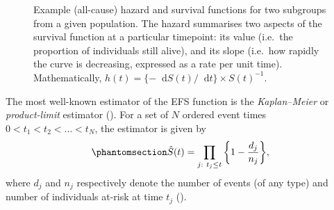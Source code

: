 \documentclass[
  letterpaper,
  DIV=11,
  numbers=noendperiod]{scrreprt}
\newcommand\diff{\mathop{}\!\mathrm{d}}
\begin{document}
\begin{figure}


\caption{\label{fig-intro-haz}Example (all-cause) hazard and survival
functions for two subgroups from a given population. The hazard
summarises two aspects of the survival function at a particular
timepoint: its value (i.e.~the proportion of individuals still alive),
and its slope (i.e.~how rapidly the curve is decreasing, expressed as a
rate per unit time). Mathematically,
\(h(t) = \{-\diff S(t)/\diff t\} \times S(t)^{-1}\).}

\end{figure}%

The most well-known estimator of the EFS function is the
\emph{Kaplan--Meier} or \emph{product-limit} estimator
(). For a set of \(N\) ordered event times
\(0 < t_1 < t_2 < \dots < t_N\), the estimator is given by
\begin{equation}\phantomsection\label{eq-kaplan}{
\hat{S}(t) = \prod_{j:\ t_j \leq t} \bigg\{1 - \frac{d_j}{n_j}\bigg\},
}\end{equation} where \(d_j\) and \(n_j\) respectively denote the number
of events (of any type) and number of individuals at-risk at time
\(t_j\) ().
\end{document}
